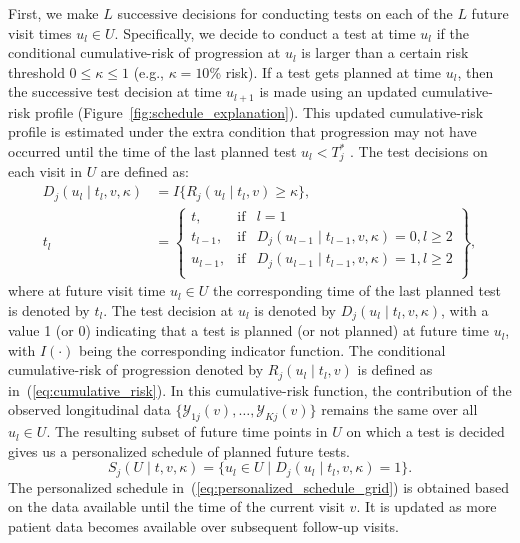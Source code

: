 First, we make $L$ successive decisions for conducting tests on each of the $L$ future visit times $u_l \in U$. Specifically, we decide to conduct a test at time $u_l$ if the conditional cumulative-risk of progression at $u_l$ is larger than a certain risk threshold $0 \leq \kappa \leq 1$ (e.g., $\kappa=10$\% risk). If a test gets planned at time $u_l$, then the successive test decision at time $u_{l+1}$ is made using an updated cumulative-risk profile (Figure~\ref{fig:schedule_explanation}). This updated cumulative-risk profile is estimated under the extra condition that progression may not have occurred until the time of the last planned test $u_l < T^*_j$ . The test decisions on each visit in $U$ are defined as: 
\begin{equation*}
\label{eq:personalized_decision_grid}
\begin{split}
D_j(u_l \mid t_l, v, \kappa) &= I\big\{R_j(u_l \mid t_l, v) \geq \kappa \big\},\\
t_l &= \left\{\begin{array}{lcr}
  t, &\mbox{if}& l=1\\
  t_{l-1}, &\mbox{if}&  D_j(u_{l-1} \mid t_{l-1}, v, \kappa)=0, l\geq 2\\ 
  u_{l-1}, &\mbox{if}&  D_j(u_{l-1} \mid t_{l-1}, v, \kappa)=1, l\geq 2\\
\end{array} \right\},
\end{split}
\end{equation*}
where at future visit time $u_l \in U$ the corresponding time of the last planned test is denoted by $t_l$. The test decision at $u_l$ is denoted by $D_j(u_l \mid t_l, v, \kappa)$, with a value 1 (or 0) indicating that a test is planned (or not planned) at future time $u_l$, with $I(\cdot)$ being the corresponding indicator function. The conditional cumulative-risk of progression denoted by $R_j(u_l \mid t_l, v)$ is defined as in~(\ref{eq:cumulative_risk}). In this cumulative-risk function, the contribution of the observed longitudinal data $\{\mathcal{Y}_{1j}(v), \ldots, \mathcal{Y}_{Kj}(v)\}$ remains the same over all $u_l \in U$. The resulting subset of future time points in $U$ on which a test is decided gives us a personalized schedule of planned future tests.
\begin{equation}
\label{eq:personalized_schedule_grid}
S_j(U \mid t, v, \kappa) = \big\{ u_l \in U \mid D_j(u_l \mid t_l, v, \kappa)=1\big\}.
\end{equation}
The personalized schedule in~(\ref{eq:personalized_schedule_grid}) is obtained based on the data available until the time of the current visit $v$. It is updated as more patient data becomes available over subsequent follow-up visits.

